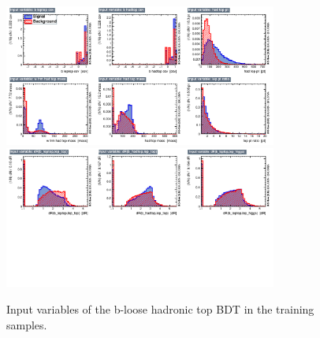 
\begin{figure}[hbtp]
 \begin{center}
   \includegraphics[width=0.8\textwidth]{ch9_figs/recoBdt_bloose/variables_id_c1.pdf}
   \includegraphics[width=0.8\textwidth]{ch9_figs/recoBdt_bloose/variables_id_c2.pdf}
   \caption[Input variables of the b-loose hadronic top BDT]{Input variables of the b-loose hadronic top BDT in the training samples.}
   \label{fig:recoBdt_bloose_inputs}
 \end{center}
\end{figure}

